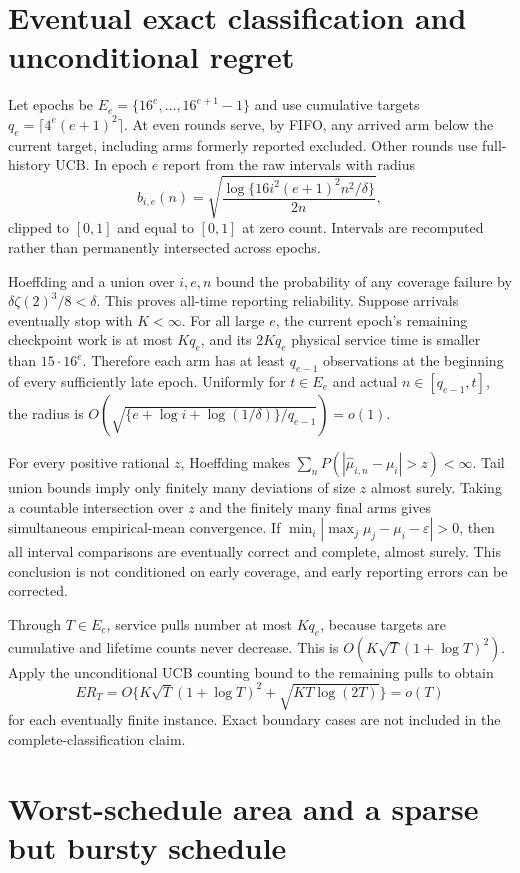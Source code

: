 \section{Eventual exact classification and unconditional regret}
\label{app:consistency}

Let epochs be $E_e=\{16^e,\ldots,16^{e+1}-1\}$ and use cumulative targets
$q_e=\lceil4^e(e+1)^2\rceil$. At even rounds serve, by FIFO, any arrived
arm below the current target, including arms formerly reported excluded.
Other rounds use full-history UCB. In epoch $e$ report from the raw intervals
with radius
\[
 b_{i,e}(n)=\sqrt{\frac{\log\{16i^2(e+1)^2n^2/\delta\}}{2n}},
\]
clipped to $[0,1]$ and equal to $[0,1]$ at zero count. Intervals are
recomputed rather than permanently intersected across epochs.

Hoeffding and a union over $i,e,n$ bound the probability of any coverage
failure by $\delta\zeta(2)^3/8<\delta$. This proves all-time reporting
reliability. Suppose arrivals eventually stop with $K<\infty$. For all large
$e$, the current epoch's remaining checkpoint work is at most $Kq_e$, and
its $2Kq_e$ physical service time is smaller than $15\cdot16^e$. Therefore
each arm has at least $q_{e-1}$ observations at the beginning of every
sufficiently late epoch. Uniformly for $t\in E_e$ and actual
$n\in[q_{e-1},t]$, the radius is
$O(\sqrt{\{e+\log i+\log(1/\delta)\}/q_{e-1}})=o(1)$.

For every positive rational $z$, Hoeffding makes
$\sum_nP(|\widehat\mu_{i,n}-\mu_i|>z)<\infty$. Tail union bounds imply only
finitely many deviations of size $z$ almost surely. Taking a countable
intersection over $z$ and the finitely many final arms gives simultaneous
empirical-mean convergence. If
$\min_i|\max_j\mu_j-\mu_i-\varepsilon|>0$, then all interval comparisons
are eventually correct and complete, almost surely. This conclusion is not
conditioned on early coverage, and early reporting errors can be corrected.

Through $T\in E_e$, service pulls number at most $Kq_e$, because targets are
cumulative and lifetime counts never decrease. This is
$O(K\sqrt T(1+\log T)^2)$. Apply the unconditional UCB counting bound to
the remaining pulls to obtain
\[
 ER_T=O\{K\sqrt T(1+\log T)^2+\sqrt{KT\log(2T)}\}=o(T)
\]
for each eventually finite instance. Exact boundary cases are not included
in the complete-classification claim.

\section{Worst-schedule area and a sparse but bursty schedule}
\label{app:worst_area}

